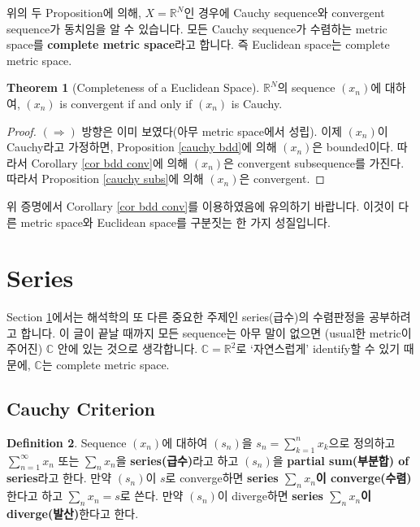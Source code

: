 \documentclass[12pt]{article}
\theoremstyle{definition}
\newtheorem{thm}{Theorem}[section]
\newtheorem{defn}[thm]{Definition}
\def\RR{\mathbb{R}}
\def\CC{\mathbb{C}}
\begin{document}
위의 두 Proposition에 의해, \(X = \RR^N\)인 경우에 Cauchy sequence와 convergent sequence가 동치임을 알 수 있습니다. 모든 Cauchy sequence가 수렴하는 metric space를 \textbf{complete metric space}라고 합니다. 즉 Euclidean space는 complete metric space.

	\begin{thm}[Completeness of a Euclidean Space]
		\(\RR^N\)의 sequence \((x_n)\)에 대하여, \((x_n)\) is convergent if and only if \((x_n)\) is Cauchy.
	\end{thm}
	\begin{proof}
		\((\Rightarrow)\) 방향은 이미 보였다(아무 metric space에서 성립). 이제 \((x_n)\)이 Cauchy라고 가정하면, Proposition \ref{cauchy bdd}에 의해 \((x_n)\)은 bounded이다. 따라서 Corollary \ref{cor bdd conv}에 의해 \((x_n)\)은 convergent subsequence를 가진다. 따라서 Proposition \ref{cauchy subs}에 의해 \((x_n)\)은 convergent.
	\end{proof}

위 증명에서 Corollary \ref{cor bdd conv}를 이용하였음에 유의하기 바랍니다. 이것이 다른 metric space와 Euclidean space를 구분짓는 한 가지 성질입니다.

\newpage

\section{Series} \label{sec series}


Section \ref{sec series}에서는 해석학의 또 다른 중요한 주제인 series(급수)의 수렴판정을 공부하려고 합니다. 이 글이 끝날 때까지 모든 sequence는 아무 말이 없으면 (usual한 metric이 주어진) \(\CC\) 안에 있는 것으로 생각합니다. \(\CC = \RR^2\)로 `자연스럽게' identify할 수 있기 때문에, \(\CC\)는 complete metric space.

\subsection{Cauchy Criterion}

	\begin{defn}
		Sequence \((x_n)\)에 대하여 \((s_n)\)을 \(s_n = \sum_{k=1}^n x_k\)으로 정의하고 \(\sum_{n=1}^\infty x_n\) 또는 \(\sum_n x_n\)을 \textbf{series(급수)}라고 하고 \((s_n)\)을 \textbf{partial sum(부분합) of series}라고 한다. 만약 \((s_n)\)이 \(s\)로 converge하면 \textbf{series \(\sum_n x_n\)이 converge(수렴)}한다고 하고 \(\sum_n x_n = s\)로 쓴다. 만약 \((s_n)\)이 diverge하면 \textbf{series \(\sum_n x_n\)이 diverge(발산)}한다고 한다.
	\end{defn}
\end{document}
